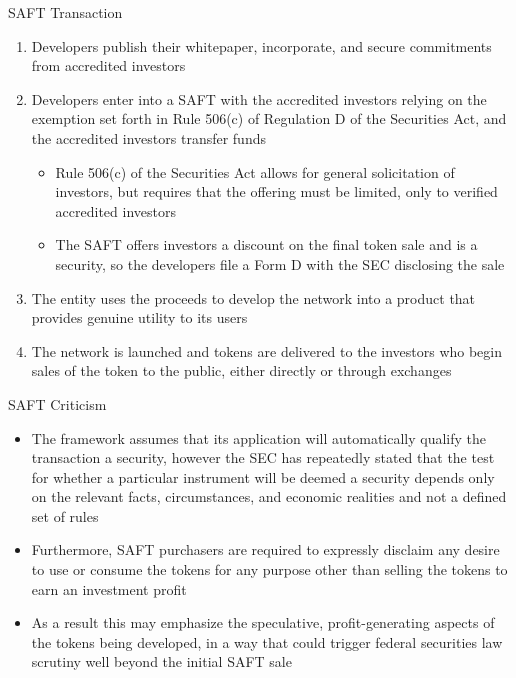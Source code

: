 \documentclass[11pt]{beamer}
\begin{document}

\begin{frame}{SAFT Transaction}
	\begin{enumerate}
		\item Developers publish their whitepaper, incorporate, and secure commitments from accredited investors
		\item Developers enter into a SAFT with the accredited investors relying on the exemption set forth in Rule 506(c) of Regulation D of the Securities Act, and the accredited investors transfer funds
		\begin{itemize}
			\item Rule 506(c) of the Securities Act allows for general solicitation of investors, but requires that the offering must be limited, only to verified accredited investors
			\item The SAFT offers investors a discount on the final token sale and is a security, so the developers file a Form D with the SEC disclosing the sale
		\end{itemize}
		\item The entity uses the proceeds to develop the network into a product that provides genuine utility to its users
		\item The network is launched and tokens are delivered to the investors who begin sales of the token to the public, either directly or through exchanges
	\end{enumerate}
\end{frame}


\begin{frame}{SAFT Criticism}
	\begin{itemize}
		\item The framework assumes that its application will automatically qualify the transaction a security, however the SEC has repeatedly stated that the test for whether a particular instrument will be deemed a security depends only on the relevant facts, circumstances, and economic realities and not a defined set of rules
		\item Furthermore, SAFT purchasers are required to expressly disclaim any desire to use or consume the tokens for any purpose other than selling the tokens to earn an investment profit
		\item As a result this may emphasize the speculative, profit-generating aspects of the tokens being developed, in a way that could trigger federal securities law scrutiny well beyond the initial SAFT sale
	\end{itemize}
\end{frame}
\end{document}
